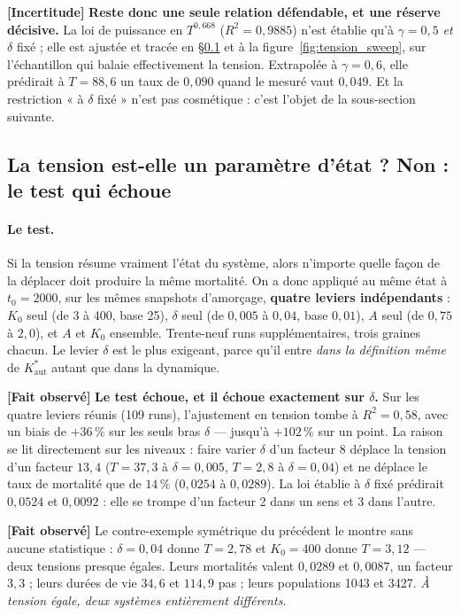 \documentclass[11pt,a4paper]{article}
\newcommand{\Kaut}{K^{*}_{\mathrm{aut}}}
\newcommand{\fait}{\textbf{[Fait observé]}}
\newcommand{\incertitude}{\textbf{[Incertitude]}}
\begin{document}
\incertitude{} \textbf{Reste donc une seule relation défendable, et une
réserve décisive.} La loi de puissance en $T^{0{,}668}$ ($R^2 = 0{,}9885$)
n'est établie qu'à $\gamma = 0{,}5$ \emph{et} $\delta$ fixé ; elle est
ajustée et tracée en §\ref{sec:tension_test} et à la
figure~\ref{fig:tension_sweep}, sur l'échantillon qui balaie effectivement la
tension. Extrapolée à $\gamma = 0{,}6$, elle prédirait à $T = 88{,}6$ un taux
de $0{,}090$ quand le mesuré vaut $0{,}049$. Et la restriction « à $\delta$
fixé » n'est pas cosmétique : c'est l'objet de la sous-section suivante.

\subsection{La tension est-elle un paramètre d'état ? Non : le test qui
échoue}
\label{sec:tension_test}

\paragraph{Le test.} Si la tension résume vraiment l'état du système, alors
n'importe quelle façon de la déplacer doit produire la même mortalité. On a
donc appliqué au même état à $t_0 = 2000$, sur les mêmes snapshots
d'amorçage, \textbf{quatre leviers indépendants} : $K_0$ seul (de 3 à 400,
base 25), $\delta$ seul (de $0{,}005$ à $0{,}04$, base $0{,}01$), $A$ seul
(de $0{,}75$ à $2{,}0$), et $A$ et $K_0$ ensemble. Trente-neuf runs
supplémentaires, trois graines chacun. Le levier $\delta$ est le plus
exigeant, parce qu'il entre \emph{dans la définition même} de $\Kaut$
autant que dans la dynamique.



\fait{} \textbf{Le test échoue, et il échoue exactement sur $\delta$.} Sur
les quatre leviers réunis (109 runs), l'ajustement en tension tombe à
$R^2 = 0{,}58$, avec un biais de $+36\,\%$ sur les seuls bras $\delta$ ---
jusqu'à $+102\,\%$ sur un point. La raison se lit directement sur les
niveaux : faire varier $\delta$ d'un facteur 8 déplace la tension d'un
facteur $13{,}4$ ($T = 37{,}3$ à $\delta = 0{,}005$, $T = 2{,}8$ à
$\delta = 0{,}04$) et ne déplace le taux de mortalité que de $14\,\%$
($0{,}0254$ à $0{,}0289$). La loi établie à $\delta$ fixé prédirait
$0{,}0524$ et $0{,}0092$ : elle se trompe d'un facteur 2 dans un sens et 3
dans l'autre.

\fait{} Le contre-exemple symétrique du précédent le montre sans aucune
statistique : $\delta = 0{,}04$ donne $T = 2{,}78$ et $K_0 = 400$ donne
$T = 3{,}12$ --- deux tensions presque égales. Leurs mortalités valent
$0{,}0289$ et $0{,}0087$, un facteur $3{,}3$ ; leurs durées de vie $34{,}6$
et $114{,}9$ pas ; leurs populations 1043 et 3427. \emph{À tension égale,
deux systèmes entièrement différents.}
\end{document}
